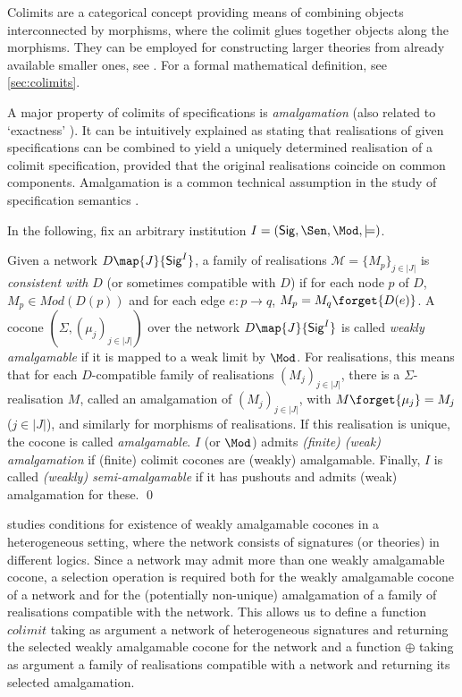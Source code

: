 \documentclass[10pt, a4paper]{isov2}
\newcommand{\Sig}{\mathsf{Sig}}
\begin{document}
Colimits are a categorical concept providing means of
combining objects interconnected by morphisms, where the colimit
glues together objects along the morphisms.
They can be employed for constructing larger theories from already available 
smaller ones, see \cite{GoguenBurstall92}. For a formal mathematical definition,
see \ref{sec:colimits}.


A major property of colimits of specifications is \emph{amalgamation} (also related to `exactness' \cite{DGS91}). It can be intuitively explained as 
stating that realisations of given
specifications can be combined to yield a uniquely determined realisation of
a colimit specification, provided that the original realisations coincide on
common components. Amalgamation is a common technical assumption in the 
study of specification semantics
\cite{STbook}.

In the following, fix an arbitrary institution
$I=(\Sig,\Sen,\Mod,\models)$.  

\begin{definition}
Given a network $D\map{J}{\Sig^I}$, 
a family of realisations $\mathcal{M} = \{M_p\}_{j\in |J|}$ is
\emph{consistent with} $D$ (or sometimes compatible with $D$) 
if for each node $p$ of $D$, $M_p \in Mod(D(p))$ and
for each edge $e:p\rightarrow q$, $M_p = M_q\forget{D(e)}$.
  A cocone
$(\Sigma,(\mu_j)_{j\in|J|})$ over the network $D\map{J}{\Sig^I}$ is
called \emph{weakly amalgamable} if it is mapped to a weak limit by $\Mod$.
For realisations, this means that for each $D$-compatible family of
realisations $(M_j)_{j\in|J|}$, there is a $\Sigma$-realisation $M$, called an amalgamation of 
 $(M_j)_{j\in|J|}$,
with
$M\forget{\mu_j}=M_j$ ($j\in|J|$), and similarly for morphisms of
realisations.
 If this realisation is unique, the cocone
is called \emph{amalgamable}. 
$I$ (or $\Mod$) admits \emph{(finite) (weak)
amalgamation} if (finite) colimit cocones are (weakly) amalgamable.
Finally, $I$ is called \emph{(weakly) semi-amalgamable} if 
it has pushouts and admits (weak) amalgamation for these.
\qed\end{definition}

\cite{weakcol} studies conditions for existence of weakly amalgamable cocones
in a heterogeneous setting, where the network consists of signatures (or theories)
in different logics. Since a network may admit more than one weakly amalgamable cocone,
a selection operation is required both for the weakly amalgamable cocone of a network 
and for the (potentially non-unique) amalgamation of a family of realisations compatible with the
network. This allows us to define a function
$colimit$ taking as argument a network of heterogeneous signatures and
returning the selected weakly amalgamable cocone for the network and
a function $\oplus$ taking as argument a family of realisations compatible with a network
and returning its selected amalgamation.
\end{document}
